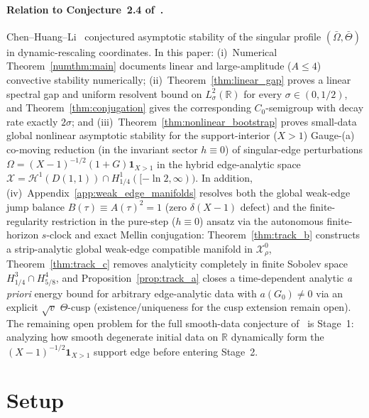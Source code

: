 \documentclass[11pt,a4paper]{article}
\begin{document}
\paragraph{Relation to Conjecture~2.4 of~\cite{chen2026houluo}.}
Chen--Huang--Li~\cite[Conj.~2.4]{chen2026houluo} conjectured asymptotic stability of the
singular profile $(\bar\Omega,\bar\Theta)$ in dynamic-rescaling coordinates.
In this paper: (i)~Numerical Theorem~\ref{numthm:main} documents linear and large-amplitude
($A\le 4$) convective stability numerically; (ii)~Theorem~\ref{thm:linear_gap} proves a
linear spectral gap and uniform resolvent bound on $L^2_\sigma(\mathbb{R})$ for every
$\sigma\in(0,1/2)$, and Theorem~\ref{thm:conjugation} gives the corresponding $C_0$-semigroup with
decay rate exactly $2\sigma$; and (iii)~Theorem~\ref{thm:nonlinear_bootstrap} proves small-data
global nonlinear asymptotic stability for the support-interior ($X>1$) Gauge-(a) co-moving
reduction (in the invariant sector $h\equiv 0$) of singular-edge perturbations
$\Omega=(X-1)^{-1/2}(1+G)\mathbf{1}_{X>1}$ in the hybrid edge-analytic space
$\mathcal{X}=\mathcal{H}^1(D(1,1))\cap H^1_{1/4}([-\ln 2,\infty))$.
In addition, (iv)~Appendix~\ref{app:weak_edge_manifolds} resolves both the global weak-edge jump
balance $B(\tau)\equiv A(\tau)^2=1$ (zero $\delta(X-1)$ defect) and the finite-regularity
restriction in the pure-step ($h\equiv 0$) ansatz via the autonomous finite-horizon $s$-clock and
exact Mellin conjugation: Theorem~\ref{thm:track_b} constructs a strip-analytic global weak-edge
compatible manifold in $\mathcal{X}_\rho^0$, Theorem~\ref{thm:track_c} removes analyticity
completely in finite Sobolev space $H^3_{1/4}\cap H^4_{5/8}$, and
Proposition~\ref{prop:track_a} closes a time-dependent analytic \emph{a priori} energy bound for
arbitrary edge-analytic data with $a(G_0)\ne 0$ via an explicit $\sqrt{v}$ $\Theta$-cusp
(existence/uniqueness for the cusp extension remain open).
The remaining open problem for the full smooth-data conjecture of~\cite{chen2026houluo} is
Stage~1: analyzing how smooth degenerate initial data on $\mathbb{R}$ dynamically form the
$(X-1)^{-1/2}\mathbf{1}_{X>1}$ support edge before entering Stage~2.

\section{Setup}
\end{document}
